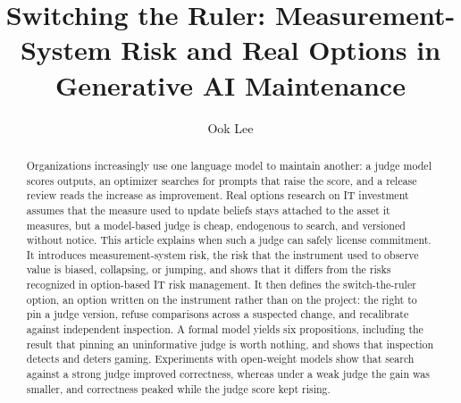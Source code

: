\documentclass[acmsmall,screen,review]{acmart}
\theoremstyle{acmdefinition}
\begin{document}
\title[Switching the Ruler]{Switching the Ruler: Measurement-System Risk and Real Options in Generative AI Maintenance}

\author{Ook Lee}

\renewcommand{\shortauthors}{Ook Lee}

\begin{abstract}
Organizations increasingly use one language model to maintain another: a judge model scores outputs, an optimizer searches for prompts that raise the score, and a release review reads the increase as improvement. Real options research on IT investment assumes that the measure used to update beliefs stays attached to the asset it measures, but a model-based judge is cheap, endogenous to search, and versioned without notice. This article explains when such a judge can safely license commitment. It introduces measurement-system risk, the risk that the instrument used to observe value is biased, collapsing, or jumping, and shows that it differs from the risks recognized in option-based IT risk management. It then defines the switch-the-ruler option, an option written on the instrument rather than on the project: the right to pin a judge version, refuse comparisons across a suspected change, and recalibrate against independent inspection. A formal model yields six propositions, including the result that pinning an uninformative judge is worth nothing, and shows that inspection detects and deters gaming. Experiments with open-weight models show that search against a strong judge improved correctness, whereas under a weak judge the gain was smaller, and correctness peaked while the judge score kept rising.
\end{abstract}

\begin{CCSXML}
\end{CCSXML}



\maketitle
\end{document}
